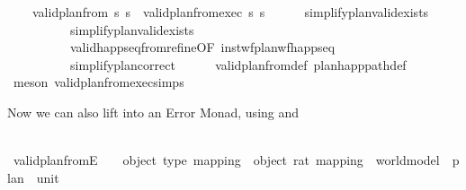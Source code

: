 \begin{isabellebody}
\ \ \ \ {\isachardoublequoteopen}valid{\isacharunderscore}{\kern0pt}plan{\isacharunderscore}{\kern0pt}from{}\ s\ {\isasympi}s\ {\isasymlongleftrightarrow}\ valid{\isacharunderscore}{\kern0pt}plan{\isacharunderscore}{\kern0pt}from{}{\isacharunderscore}{\kern0pt}exec\ s\ {\isasympi}s{\isachardoublequoteclose}\isanewline
%
\isadelimproof
\ \ \ \ %
\endisadelimproof
%
\isatagproof
{}\isamarkupfalse%
\ simplify{\isacharunderscore}{\kern0pt}plan{\isacharunderscore}{\kern0pt}valid{\isacharunderscore}{\kern0pt}exists{}\ \isanewline
\ \ \ \ \ \ \ \ \ \ simplify{\isacharunderscore}{\kern0pt}plan{\isacharunderscore}{\kern0pt}valid{\isacharunderscore}{\kern0pt}exists{}\isanewline
\ \ \ \ \ \ \ \ \ \ valid{\isacharunderscore}{\kern0pt}happ{\isacharunderscore}{\kern0pt}seq{\isacharunderscore}{\kern0pt}from{\isacharunderscore}{\kern0pt}refine{\isacharbrackleft}{\kern0pt}OF\ inst{\isacharunderscore}{\kern0pt}wf{\isacharunderscore}{\kern0pt}plan{\isacharunderscore}{\kern0pt}wf{\isacharunderscore}{\kern0pt}happ{\isacharunderscore}{\kern0pt}seq{\isacharbrackright}{\kern0pt}\isanewline
\ \ \ \ \ \ \ \ \ \ simplify{\isacharunderscore}{\kern0pt}plan{\isacharunderscore}{\kern0pt}correct\isanewline
\ \ \ \ \isamarkupfalse%
\ valid{\isacharunderscore}{\kern0pt}plan{\isacharunderscore}{\kern0pt}from{}{\isacharunderscore}{\kern0pt}def\ plan{\isacharunderscore}{\kern0pt}happ{\isacharunderscore}{\kern0pt}path{\isacharunderscore}{\kern0pt}def\isanewline
\ \ \ \ \isamarkupfalse%
\ {\isacharparenleft}{\kern0pt}meson\ valid{\isacharunderscore}{\kern0pt}plan{\isacharunderscore}{\kern0pt}from{}{\isacharunderscore}{\kern0pt}exec{\isachardot}{\kern0pt}simps{\isacharparenright}{\kern0pt}%
\endisatagproof
{\isafoldproof}%
%
\isadelimproof
%
\endisadelimproof
%
\begin{isamarkuptext}%
Now we can also lift  into an Error Monad, 
  using  and %
\end{isamarkuptext}\isamarkuptrue%
\ \ \isamarkupfalse%
\ valid{\isacharunderscore}{\kern0pt}plan{\isacharunderscore}{\kern0pt}from{}E\ {\isacharcolon}{\kern0pt}{\isacharcolon}{\kern0pt}\ {\isachardoublequoteopen}{\isacharunderscore}{\kern0pt}\ {\isasymRightarrow}\ {\isacharparenleft}{\kern0pt}object{\isacharcomma}{\kern0pt}\ type{\isacharparenright}{\kern0pt}\ mapping\ {\isasymRightarrow}\ {\isacharparenleft}{\kern0pt}object{\isacharcomma}{\kern0pt}\ rat{\isacharparenright}{\kern0pt}\ mapping\ {\isasymRightarrow}\ world{\isacharunderscore}{\kern0pt}model\ {\isasymRightarrow}\ plan\ {\isasymRightarrow}\ {\isacharunderscore}{\kern0pt}{\isacharplus}{\kern0pt}unit{\isachardoublequoteclose}\ \isanewline

\end{isabellebody}
